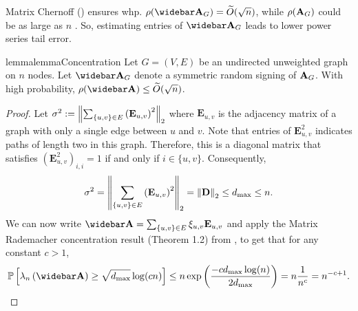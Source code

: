 Matrix Chernoff () ensures whp. $\rho({\As}_G) = \Otilde{\sqrt{n}}$, while $\rho({\mathbf{A}}_G)$ could be as large as $n$ \cite{tropp2012user}. So, estimating entries of ${\As}_G$ leads to lower power series tail error. 

\begin{restatable}{lemma}{lemmaConcentration}\label{lemma:concentration} Let $G = (V, E)$ be an undirected unweighted graph on $n$ nodes. Let $\As_G$ denote a symmetric random signing of $\mathbf{A}_G$. With high probability, $\rho(\As) \leq \Otilde{\sqrt{n}}$.  
\end{restatable}
\begin{proof} Let $\sigma^2 := \left\Vert \sum_{\{u,v\} \in E} \left(\mathbf{E}_{u,v}\right)^2  \right\Vert_2$ where $\mathbf{E}_{u,v}$ is the adjacency matrix of a graph with only a single edge between $u$ and $v$. Note that entries of $\mathbf{E}_{u,v}^2$ indicates paths of length two in this graph. Therefore, this is a diagonal matrix that satisfies $\left(\mathbf{E}_{u,v}^2\right)_{i,i} = 1$ if and only if $i \in \{u, v\}$. Consequently, 
\begin{align*}
    \sigma^2 = \left\Vert \sum_{\{u,v\} \in E} \left(\mathbf{E}_{u,v}\right)^2 \right\Vert_2 = \left\Vert \mathbf{D} \right\Vert_2 \leq d_{\max} \leq n. 
\end{align*}
We can now write $\As = \sum_{\{u,v\} \in E} \rad_{u,v} \mathbf{E}_{u,v}$ and apply the Matrix Rademacher concentration result (Theorem 1.2) from \cite{tropp2012user}, to get that for any constant $c > 1$, 
\begin{align*}
    \Prob{\lambda_{n}\left( \Abar \right) \geq \sqrt{\dmax} \log(c n)} \leq n \Exp{\frac{-c \dmax \log(n)}{2\dmax}} = n { \frac{1}{n^c} } = n^{-c+1}. 
\end{align*}
\end{proof}

